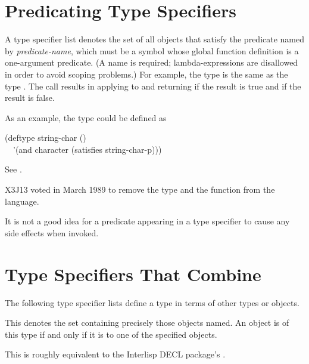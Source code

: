 \section{Predicating Type Specifiers}
\label{PREDICATING-TYPE-SPECIFIERS-SECTION}

A type specifier list  denotes
the set of all objects that satisfy the predicate named by {\it predicate-name},
which must be a symbol whose global function definition is a one-argument
predicate.
(A name is required; lambda-expressions are disallowed in order to avoid
scoping problems.)  For example, the type  is the
same as the type .
The call  results in applying  to 
and returning  if the result is true and {\nil} if the result is false.

\begin{obsolete}
As an example, the type  could be defined as
\begin{lisp}
(deftype string-char () \\
~~'(and character (satisfies string-char-p)))
\end{lisp}
See .
\end{obsolete}

\begin{newer}
X3J13 voted in March 1989  to remove the type 
and the function  from the language.
\end{newer}

It is not a good idea for
a predicate appearing in a  type specifier to
cause any side effects when invoked.

\section{Type Specifiers That Combine}

The following type specifier lists define a type in terms of
other types or objects.

\begin{flushdesc}
\item[\cd{(member {\it object1} {\it object2} ...)}]
This denotes the set
containing precisely those objects named.  An object is of
this type if and only if it is  to one of the specified objects.

\beforenoterule
\begin{incompatibility}
This is roughly equivalent to
the Interlisp DECL package's .
\end{incompatibility}
\afternoterule
\end{flushdesc}


